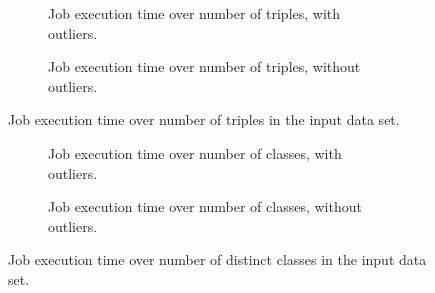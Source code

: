 \begin{figure}[ht]
  \begin{subfigure}{\textwidth}
    \centering
    
    \caption{Job execution time over number of  triples, with outliers.}
    \label{fig:jobs-over-P31s-with-outliers}
  \end{subfigure}
  \begin{subfigure}{\textwidth}
    \centering
    
    \caption{Job execution time over number of  triples, without outliers.}
    \label{fig:jobs-over-P31s-without-outliers}
  \end{subfigure}
  \caption{Job execution time over number of  triples in the input data set.}
  \label{fig:jobs-over-P31s}
\end{figure}

\begin{figure}[ht]
  \begin{subfigure}{\textwidth}
    \centering
    
    \caption{Job execution time over number of classes, with outliers.}
    \label{fig:jobs-over-classes-with-outliers}
  \end{subfigure}
  \begin{subfigure}{\textwidth}
    \centering
    
    \caption{Job execution time over number of classes, without outliers.}
    \label{fig:jobs-over-classes-without-outliers}
  \end{subfigure}
  \caption{Job execution time over number of distinct classes in the input data set.}
  \label{fig:jobs-over-classes}
\end{figure}
